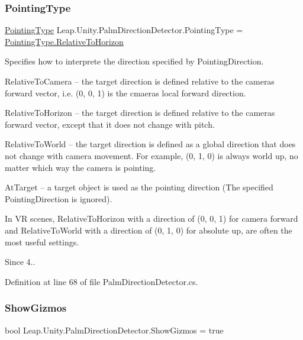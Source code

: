 \subsubsection{\texorpdfstring{PointingType}{PointingType}}
{\footnotesize\ttfamily \mbox{\hyperlink{namespace_leap_1_1_unity_a34b9e7741bfe47e7a9b1c2bffbe7f4cf}{Pointing\+Type}} Leap.\+Unity.\+Palm\+Direction\+Detector.\+Pointing\+Type = \mbox{\hyperlink{namespace_leap_1_1_unity_a34b9e7741bfe47e7a9b1c2bffbe7f4cfa31999ab3e9ca81aefc5d2bc9c075f580}{Pointing\+Type.\+Relative\+To\+Horizon}}}

Specifies how to interprete the direction specified by Pointing\+Direction.


\begin{DoxyItemize}
\item Relative\+To\+Camera -- the target direction is defined relative to the camera\textquotesingle{}s forward vector, i.\+e. (0, 0, 1) is the cmaera\textquotesingle{}s local forward direction.
\item Relative\+To\+Horizon -- the target direction is defined relative to the camera\textquotesingle{}s forward vector, except that it does not change with pitch.
\item Relative\+To\+World -- the target direction is defined as a global direction that does not change with camera movement. For example, (0, 1, 0) is always world up, no matter which way the camera is pointing.
\item At\+Target -- a target object is used as the pointing direction (The specified Pointing\+Direction is ignored).
\end{DoxyItemize}

In VR scenes, Relative\+To\+Horizon with a direction of (0, 0, 1) for camera forward and Relative\+To\+World with a direction of (0, 1, 0) for absolute up, are often the most useful settings. \begin{DoxySince}{Since}
4.. 
\end{DoxySince}


Definition at line 68 of file Palm\+Direction\+Detector.\+cs.

\mbox{\label{class_leap_1_1_unity_1_1_palm_direction_detector_a138b25d96be20bfb150f7cfadfaee8bf}} 
\subsubsection{\texorpdfstring{ShowGizmos}{ShowGizmos}}
{\footnotesize\ttfamily bool Leap.\+Unity.\+Palm\+Direction\+Detector.\+Show\+Gizmos = true}

